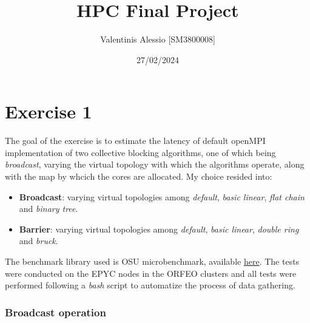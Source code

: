 \documentclass{article}
\title{HPC Final Project}
\author{Valentinis Alessio [SM3800008]}
\date{27/02/2024}
\begin{document}
	\maketitle
	\tableofcontents
	
	\part{Exercise 1}
	
	The goal of the exercise is to estimate the latency of default openMPI implementation of two collective blocking algorithms, one of which being \textit{broadcast}, varying the virtual topology with which the algorithms operate, along with the map by whcich the cores are allocated.
	My choice resided into:
	\begin{itemize}
		\item \textbf{Broadcast}: varying virtual topologies among \textit{default}, \textit{basic linear}, \textit{flat chain} and \textit{binary tree}.\\
		\item \textbf{Barrier}: varying virtual topologies among \textit{default}, \textit{basic linear}, \textit{double ring} and \textit{bruck}.
	\end{itemize}
	
	The benchmark library used is OSU microbenchmark, available \href{https://mvapich.cse.ohio-state.edu/benchmarks/}{here}.
	The tests were conducted on the EPYC nodes in the ORFEO clusters and all tests were performed following a \textit{bash} script to automatize the process of data gathering.
	
	\section{Broadcast operation}
	
\end{document}

